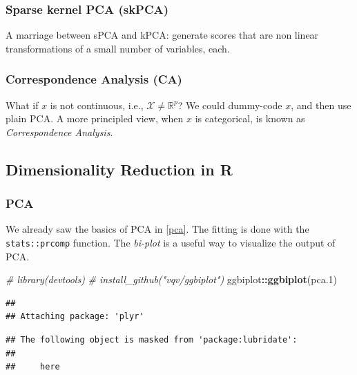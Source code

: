 \documentclass[]{book}
\newenvironment{Shaded}{\begin{snugshade}}{\end{snugshade}}
\newcommand{\CommentTok}[1]{\textcolor[rgb]{0.56,0.35,0.01}{\textit{#1}}}
\newcommand{\FloatTok}[1]{\textcolor[rgb]{0.00,0.00,0.81}{#1}}
\newcommand{\KeywordTok}[1]{\textcolor[rgb]{0.13,0.29,0.53}{\textbf{#1}}}
\newcommand{\NormalTok}[1]{#1}
\newcommand{\OperatorTok}[1]{\textcolor[rgb]{0.81,0.36,0.00}{\textbf{#1}}}
\theoremstyle{definition}
\theoremstyle{definition}
\theoremstyle{definition}
\theoremstyle{remark}
\begin{document}
\hypertarget{sparse-kernel-pca-skpca}{%
\subsubsection{Sparse kernel PCA (skPCA)}\label{sparse-kernel-pca-skpca}}

A marriage between sPCA and kPCA: generate scores that are non linear transformations of a small number of variables, each.

\hypertarget{correspondence-analysis-ca}{%
\subsubsection{Correspondence Analysis (CA)}\label{correspondence-analysis-ca}}

What if \(x\) is not continuous, i.e., \(\mathcal{X}\neq \mathbb{R}^p\)?
We could dummy-code \(x\), and then use plain PCA.
A more principled view, when \(x\) is categorical, is known as \emph{Correspondence Analysis}.

\hypertarget{dimensionality-reduction-in-r}{%
\subsection{Dimensionality Reduction in R}\label{dimensionality-reduction-in-r}}

\hypertarget{pca-in-r}{%
\subsubsection{PCA}\label{pca-in-r}}

We already saw the basics of PCA in \ref{pca}.
The fitting is done with the \texttt{stats::prcomp} function.
The \emph{bi-plot} is a useful way to visualize the output of PCA.

\begin{Shaded}
\begin{Highlighting}[]
\CommentTok{# library(devtools)}
\CommentTok{# install_github("vqv/ggbiplot")}
\NormalTok{ggbiplot}\OperatorTok{::}\KeywordTok{ggbiplot}\NormalTok{(pca}\FloatTok{.1}\NormalTok{) }
\end{Highlighting}
\end{Shaded}

\begin{verbatim}
## 
## Attaching package: 'plyr'
\end{verbatim}

\begin{verbatim}
## The following object is masked from 'package:lubridate':
## 
##     here
\end{verbatim}
\end{document}
